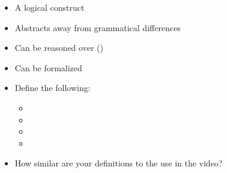 \documentclass[a4paper,landscape,headrule,footrule,xetex,25pt]{foils}
\begin{document}
\begin{itemize}
\item A logical construct
\item Abstracts away from grammatical differences
\begin{exe}
  \ex {}
  \ex {}
  \ex  {} 
\end{exe}
\item Can be reasoned over ()
\item Can be formalized
\\ 
\end{itemize}



\begin{itemize}
\item Define the following:
  \begin{itemize}
  \item {}
  \item {}
  \item {}
  \item {}
  \end{itemize}
\item How similar are your definitions to the use in the video?
\end{itemize}
\end{document}

